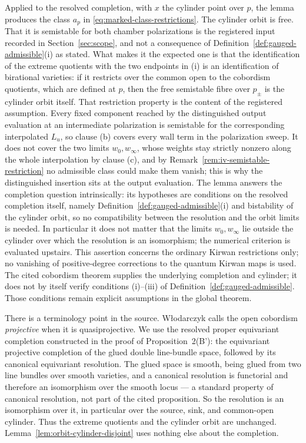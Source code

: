 Applied to the resolved completion, with \(x\) the cylinder point over
\(p\), the lemma produces the class \(a_p\) in
\eqref{eq:marked-class-restrictions}.  The cylinder orbit is free.  That it is
semistable for both chamber polarizations is the registered input recorded in
Section~\ref{sec:scope}, and not a consequence of
Definition~\ref{def:gauged-admissible}\textup{(i)} as stated.  What makes it
the expected one is that the identification of the
extreme quotients with the two endpoints in \textup{(i)} is an identification
of birational varieties: if it restricts over the common open to the cobordism
quotients, which are defined at \(p\), then the free semistable fibre over
\(p_\pm\) is the cylinder orbit itself.  That restriction property is the
content of the registered assumption.  Every fixed component reached by
the distinguished output evaluation at an intermediate polarization is
semistable for the corresponding interpolated \(L_u\), so
clause \textup{(b)} covers every wall term in the polarization sweep.  It does
not cover the two limits \(w_0,w_\infty\), whose weights stay strictly nonzero
along the whole interpolation by clause \textup{(c)}, and by
Remark~\ref{rem:iv-semistable-restriction} no admissible class could make them
vanish; this is why the distinguished insertion sits at the output evaluation.
The
lemma answers the completion question intrinsically: its hypotheses are
conditions on the resolved completion itself, namely
Definition~\ref{def:gauged-admissible}\textup{(i)} and bistability of the
cylinder orbit, so no compatibility between the resolution and the orbit
limits is needed.  In particular it does not matter that the limits
\(w_0,w_\infty\) lie outside the cylinder over which the resolution is an
isomorphism; the numerical criterion is evaluated upstairs.  This assertion
concerns the ordinary Kirwan
restrictions only; no vanishing of positive-degree corrections to the quantum
Kirwan maps is used.  The cited cobordism theorem supplies the underlying
completion and cylinder; it does not by itself verify conditions
\textup{(i)}--\textup{(iii)} of
Definition~\ref{def:gauged-admissible}.  Those conditions remain explicit
assumptions in the global theorem.

There is a terminology point in the source.  W{\l}odarczyk calls the open
cobordism \emph{projective} when it is quasiprojective.  We use the resolved
proper equivariant completion constructed in the proof of
Proposition~2(B'): the equivariant projective completion of the glued
double line-bundle space, followed by its canonical equivariant resolution.
The glued space is smooth, being glued from two line bundles over smooth
varieties, and a canonical resolution is functorial and therefore an
isomorphism over the smooth locus --- a standard property of canonical
resolution, not part of the cited proposition.  So the resolution is an
isomorphism
over it, in particular over the source, sink, and common-open cylinder.
Thus the extreme quotients and the cylinder orbit are unchanged.
Lemma~\ref{lem:orbit-cylinder-disjoint} uses nothing else about the
completion.

